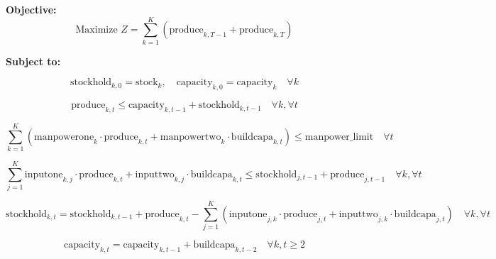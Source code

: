 \documentclass{article}
\begin{document}
\textbf{Objective:}
\[
\text{Maximize } Z = \sum_{k=1}^{K} \left( \text{produce}_{k,T-1} + \text{produce}_{k,T} \right)
\]

\textbf{Subject to:}

\[
\text{stockhold}_{k,0} = \text{stock}_{k}, \quad \text{capacity}_{k,0} = \text{capacity}_{k} \quad \forall k
\]

\[
\text{produce}_{k,t} \leq \text{capacity}_{k,t-1} + \text{stockhold}_{k,t-1} \quad \forall k, \forall t
\]

\[
\sum_{k=1}^{K} \left( \text{manpowerone}_{k} \cdot \text{produce}_{k,t} + \text{manpowertwo}_{k} \cdot \text{buildcapa}_{k,t} \right) \leq \text{manpower\_limit} \quad \forall t
\]

\[
\sum_{j=1}^{K} \text{inputone}_{k,j} \cdot \text{produce}_{k,t} + \text{inputtwo}_{k,j} \cdot \text{buildcapa}_{k,t} \leq \text{stockhold}_{j,t-1} + \text{produce}_{j,t-1} \quad \forall k, \forall t
\]

\[
\text{stockhold}_{k,t} = \text{stockhold}_{k,t-1} + \text{produce}_{k,t} - \sum_{j=1}^{K} \left( \text{inputone}_{j,k} \cdot \text{produce}_{j,t} + \text{inputtwo}_{j,k} \cdot \text{buildcapa}_{j,t} \right) \quad \forall k, \forall t
\]

\[
\text{capacity}_{k,t} = \text{capacity}_{k,t-1} + \text{buildcapa}_{k,t-2} \quad \forall k, t \geq 2
\]
\end{document}
